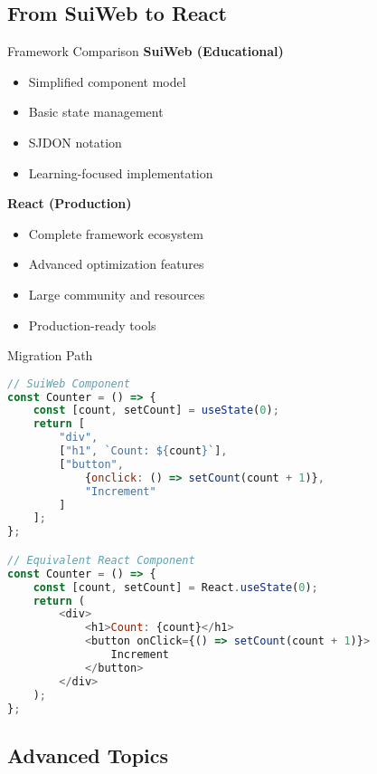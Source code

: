 \subsection{From SuiWeb to React}

\begin{concept}{Framework Comparison}
    \textbf{SuiWeb (Educational)}
    \begin{itemize}
        \item Simplified component model
        \item Basic state management
        \item SJDON notation
        \item Learning-focused implementation
    \end{itemize}

    \textbf{React (Production)}
    \begin{itemize}
        \item Complete framework ecosystem
        \item Advanced optimization features
        \item Large community and resources
        \item Production-ready tools
    \end{itemize}
\end{concept}

\begin{KR}{Migration Path}
\begin{lstlisting}[language=JavaScript, style=basesmol]
// SuiWeb Component
const Counter = () => {
    const [count, setCount] = useState(0);
    return [
        "div",
        ["h1", `Count: ${count}`],
        ["button", 
            {onclick: () => setCount(count + 1)},
            "Increment"
        ]
    ];
};

// Equivalent React Component
const Counter = () => {
    const [count, setCount] = React.useState(0);
    return (
        <div>
            <h1>Count: {count}</h1>
            <button onClick={() => setCount(count + 1)}>
                Increment
            </button>
        </div>
    );
};
\end{lstlisting}
\end{KR}

\subsection{Advanced Topics}

